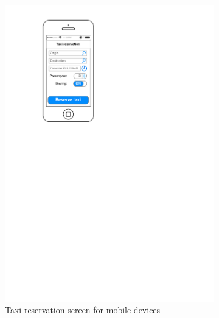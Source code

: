 \begin{figure}
    \centering
    \begin{subfigure}{0.45\textwidth}
        \centering
        \includegraphics[width=\textwidth]{mockup/app/TaxiReservation}
        \caption{Taxi reservation screen for mobile devices}
        \label{fig:mockup-reservation-mobile}
    \end{subfigure}
    \begin{subfigure}{0.45\textwidth}
        \centering

\end{subfigure}
\end{figure}
